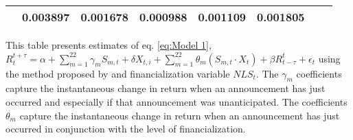 \begin{sidewaystable}
{\begin{tabular}{@{}lllllllllllll@{}}
                                 & \multicolumn{2}{c}{ 0.003897 }                                                 & \multicolumn{2}{c}{ 0.001678 }                                                 & \multicolumn{2}{c}{ 0.000988 }                                                 & \multicolumn{2}{c}{ 0.001109 }                                                   & \multicolumn{2}{c}{ 0.001805 }                                                 \\ \bottomrule 
\end{tabular}
}
\begin{tablenotes}\item 
    \singlespacing
    \footnotesize
    This table presents estimates of eq. \ref{eq:Model 1}, $R_{t}^{t+\tau}=\alpha+\sum_{m=1}^{22} \gamma_m S_{m,t}+ \delta X_{t,i} + \sum_{m=1}^{22} \theta_m (S_{m,t} \cdot X_t)+\beta R_{t-\tau}^{t}+\epsilon_{t}$ using the method proposed by \citet{kurov2019price} and financialization variable $NLS_t$. The $\gamma_m$ coefficients capture the instantaneous change in return when an announcement has just occurred and especially if that announcement was unanticipated. The coefficients $\theta_m$ capture the instantaneous change in return when an announcement has just occurred in conjunction with the level of financialization.
\end{tablenotes}
\end{sidewaystable}


